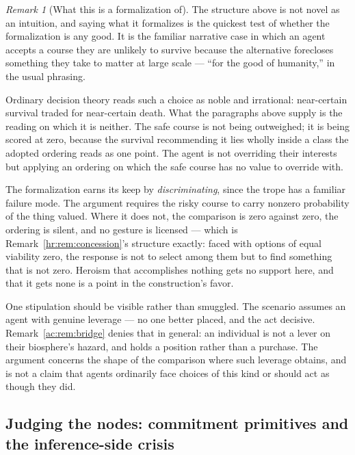 \documentclass[11pt]{article}
\numberwithin{equation}{section}
\theoremstyle{plain}
\theoremstyle{definition}
\theoremstyle{remark}
\newtheorem{remark}[theorem]{Remark}
\begin{document}
\begin{remark}[What this is a formalization of]\label{gs:rem:trope}
The structure above is not novel as an intuition, and saying what it
formalizes is the quickest test of whether the formalization is any
good. It is the familiar narrative case in which an agent accepts a
course they are unlikely to survive because the alternative forecloses
something they take to matter at large scale --- ``for the good of
humanity,'' in the usual phrasing.

Ordinary decision theory reads such a choice as noble and irrational:
near-certain survival traded for near-certain death. What the paragraphs
above supply is the reading on which it is neither. The safe course is
not being outweighed; it is being scored at zero, because the survival
recommending it lies wholly inside a class the adopted ordering reads as
one point. The agent is not overriding their interests but applying an
ordering on which the safe course has no value to override with.

The formalization earns its keep by \emph{discriminating}, since the
trope has a familiar failure mode. The argument requires the risky course
to carry nonzero probability of the thing valued. Where it does not, the
comparison is zero against zero, the ordering is silent, and no gesture
is licensed --- which is Remark~\ref{hr:rem:concession}'s structure
exactly: faced with options of equal viability zero, the response is not
to select among them but to find something that is not zero. Heroism
that accomplishes nothing gets no support here, and that it gets none is
a point in the construction's favor.

One stipulation should be visible rather than smuggled. The scenario
assumes an agent with genuine leverage --- no one better placed, and the
act decisive. Remark~\ref{ac:rem:bridge} denies that in general: an
individual is not a lever on their biosphere's hazard, and holds a
position rather than a purchase. The argument concerns the shape of the
comparison where such leverage obtains, and is not a claim that agents
ordinarily face choices of this kind or should act as though they did.
\end{remark}

\subsection{Judging the nodes: commitment primitives and the
inference-side crisis}\label{gs:sub:nodes}
\end{document}
